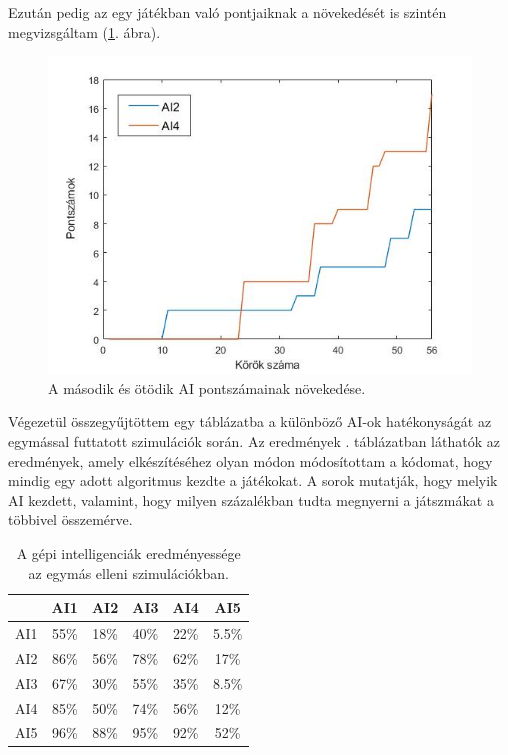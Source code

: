 Ezután pedig az egy játékban való pontjaiknak a növekedését is szintén megvizsgáltam (\ref{fig:player_scores2v5}. ábra).

\begin{figure}[h]
\centering
\includegraphics[scale=0.5]{images/player_points_AI2vsAI5.jpg}
\caption{A második és ötödik AI pontszámainak növekedése.}
\label{fig:player_scores2v5}
\end{figure}



\newpage


Végezetül összegyűjtöttem egy táblázatba a különböző AI-ok hatékonyságát az egymással futtatott szimulációk során. Az eredmények . táblázatban láthatók az eredmények, amely elkészítéséhez olyan módon módosítottam a kódomat, hogy mindig egy adott algoritmus kezdte a játékokat. A sorok mutatják, hogy melyik AI kezdett, valamint, hogy milyen százalékban tudta megnyerni a játszmákat a többivel összemérve.

\begin{table}[h]
\caption{A gépi intelligenciák eredményessége az egymás elleni szimulációkban.}
\label{tab:ai_comparison}
\medskip
\centering
\begin{tabular}{|c|c|c|c|c|c|} 
 \hline
  & AI1 & AI2 & AI3 & AI4 & AI5 \\ 
 \hline
 AI1 & 55\% & 18\% & 40\% & 22\% & 5.5\%\\ 
 \hline
 AI2 & 86\% & 56\% & 78\% & 62\% & 17\%\\ 
 \hline
 AI3 & 67\% & 30\% & 55\% & 35\% & 8.5\%\\ 
 \hline
 AI4 & 85\% & 50\% & 74\% & 56\% & 12\%\\ 
 \hline
 AI5 & 96\% & 88\% & 95\% & 92\% & 52\%\\
 \hline
\end{tabular}
\end{table}

